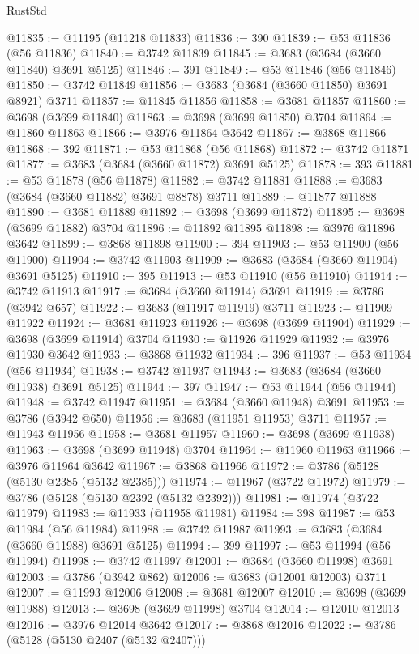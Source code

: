 \begin{lexlean}{RustStd}
\begin{coremodule}
@11835 := @11195 (@11218 @11833)
@11836 := 390
@11839 := @53 @11836 (@56 @11836)
@11840 := @3742 @11839
@11845 := @3683 (@3684 (@3660 @11840) @3691 @5125)
@11846 := 391
@11849 := @53 @11846 (@56 @11846)
@11850 := @3742 @11849
@11856 := @3683 (@3684 (@3660 @11850) @3691 @8921) @3711
@11857 := @11845 @11856
@11858 := @3681 @11857
@11860 := @3698 (@3699 @11840)
@11863 := @3698 (@3699 @11850) @3704
@11864 := @11860 @11863
@11866 := @3976 @11864 @3642
@11867 := @3868 @11866
@11868 := 392
@11871 := @53 @11868 (@56 @11868)
@11872 := @3742 @11871
@11877 := @3683 (@3684 (@3660 @11872) @3691 @5125)
@11878 := 393
@11881 := @53 @11878 (@56 @11878)
@11882 := @3742 @11881
@11888 := @3683 (@3684 (@3660 @11882) @3691 @8878) @3711
@11889 := @11877 @11888
@11890 := @3681 @11889
@11892 := @3698 (@3699 @11872)
@11895 := @3698 (@3699 @11882) @3704
@11896 := @11892 @11895
@11898 := @3976 @11896 @3642
@11899 := @3868 @11898
@11900 := 394
@11903 := @53 @11900 (@56 @11900)
@11904 := @3742 @11903
@11909 := @3683 (@3684 (@3660 @11904) @3691 @5125)
@11910 := 395
@11913 := @53 @11910 (@56 @11910)
@11914 := @3742 @11913
@11917 := @3684 (@3660 @11914) @3691
@11919 := @3786 (@3942 @657)
@11922 := @3683 (@11917 @11919) @3711
@11923 := @11909 @11922
@11924 := @3681 @11923
@11926 := @3698 (@3699 @11904)
@11929 := @3698 (@3699 @11914) @3704
@11930 := @11926 @11929
@11932 := @3976 @11930 @3642
@11933 := @3868 @11932
@11934 := 396
@11937 := @53 @11934 (@56 @11934)
@11938 := @3742 @11937
@11943 := @3683 (@3684 (@3660 @11938) @3691 @5125)
@11944 := 397
@11947 := @53 @11944 (@56 @11944)
@11948 := @3742 @11947
@11951 := @3684 (@3660 @11948) @3691
@11953 := @3786 (@3942 @650)
@11956 := @3683 (@11951 @11953) @3711
@11957 := @11943 @11956
@11958 := @3681 @11957
@11960 := @3698 (@3699 @11938)
@11963 := @3698 (@3699 @11948) @3704
@11964 := @11960 @11963
@11966 := @3976 @11964 @3642
@11967 := @3868 @11966
@11972 := @3786 (@5128 (@5130 @2385 (@5132 @2385)))
@11974 := @11967 (@3722 @11972)
@11979 := @3786 (@5128 (@5130 @2392 (@5132 @2392)))
@11981 := @11974 (@3722 @11979)
@11983 := @11933 (@11958 @11981)
@11984 := 398
@11987 := @53 @11984 (@56 @11984)
@11988 := @3742 @11987
@11993 := @3683 (@3684 (@3660 @11988) @3691 @5125)
@11994 := 399
@11997 := @53 @11994 (@56 @11994)
@11998 := @3742 @11997
@12001 := @3684 (@3660 @11998) @3691
@12003 := @3786 (@3942 @862)
@12006 := @3683 (@12001 @12003) @3711
@12007 := @11993 @12006
@12008 := @3681 @12007
@12010 := @3698 (@3699 @11988)
@12013 := @3698 (@3699 @11998) @3704
@12014 := @12010 @12013
@12016 := @3976 @12014 @3642
@12017 := @3868 @12016
@12022 := @3786 (@5128 (@5130 @2407 (@5132 @2407)))

\end{coremodule}
\end{lexlean}
